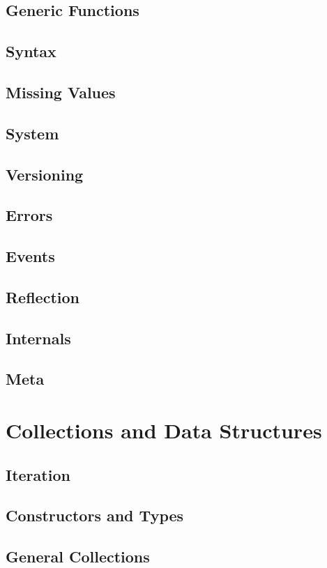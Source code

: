     \section{Generic Functions}
    \section{Syntax}
    \section{Missing Values}
    \section{System}
    \section{Versioning}
    \section{Errors}
    \section{Events}
    \section{Reflection}
    \section{Internals}
    \section{Meta}
\chapter{Collections and Data Structures}
    \section{Iteration}
    \section{Constructors and Types}
    \section{General Collections}
